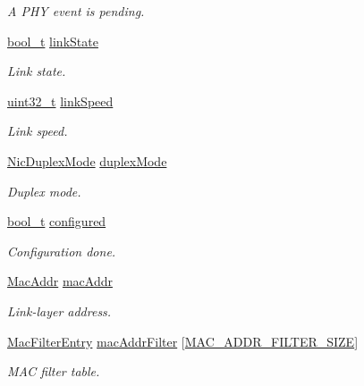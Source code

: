 \begin{DoxyCompactItemize}
\begin{DoxyCompactList}\small\item\em A P\+HY event is pending. \end{DoxyCompactList}\item 
\hyperlink{compiler__port_8h_a812d16e5494522586b3784e55d479912}{bool\+\_\+t} \hyperlink{struct__NetInterface_a4f48ab9e17cb746f6d9f08e46e112616}{link\+State}
\begin{DoxyCompactList}\small\item\em Link state. \end{DoxyCompactList}\item 
\hyperlink{stdint_8h_a435d1572bf3f880d55459d9805097f62}{uint32\+\_\+t} \hyperlink{struct__NetInterface_a7d7d4032786dfbcf147ea6599ffb146b}{link\+Speed}
\begin{DoxyCompactList}\small\item\em Link speed. \end{DoxyCompactList}\item 
\hyperlink{nic_8h_ae96e77ca948a3796e2d1900a73f133da}{Nic\+Duplex\+Mode} \hyperlink{struct__NetInterface_a92ed8095a7d5e263336aead948cee428}{duplex\+Mode}
\begin{DoxyCompactList}\small\item\em Duplex mode. \end{DoxyCompactList}\item 
\hyperlink{compiler__port_8h_a812d16e5494522586b3784e55d479912}{bool\+\_\+t} \hyperlink{struct__NetInterface_ab005a383341bb6e1882644a23613c0b6}{configured}
\begin{DoxyCompactList}\small\item\em Configuration done. \end{DoxyCompactList}\item 
\hyperlink{ethernet_8h_a1e00ed3977e8a770e8b4ae4cb306d1c0}{Mac\+Addr} \hyperlink{struct__NetInterface_a30e2da486befcc6485eb66aa93bc52f5}{mac\+Addr}
\begin{DoxyCompactList}\small\item\em Link-\/layer address. \end{DoxyCompactList}\item 
\hyperlink{structMacFilterEntry}{Mac\+Filter\+Entry} \hyperlink{struct__NetInterface_af6eaf334abb7ed0dac450614abe670ad}{mac\+Addr\+Filter} \mbox{[}\hyperlink{net__config_8h_ab64acae68b5723774fa272c62efd7c2b}{M\+A\+C\+\_\+\+A\+D\+D\+R\+\_\+\+F\+I\+L\+T\+E\+R\+\_\+\+S\+I\+ZE}\mbox{]}
\begin{DoxyCompactList}\small\item\em M\+AC filter table. \end{DoxyCompactList}\item 

\end{DoxyCompactItemize}
